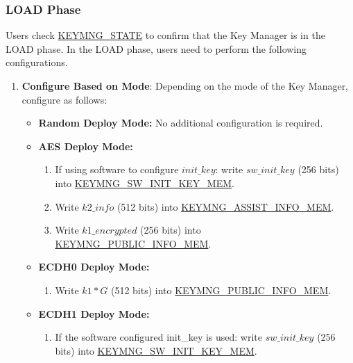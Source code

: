 \documentclass[main\_\_EN.tex]{subfiles}
\begin{document}
\subsubsection{LOAD Phase}
Users check \hyperref[fielddesc:KEYMNGSTATE]{KEYMNG\_STATE} to confirm that the Key Manager is in the LOAD phase. In the LOAD phase, users need to perform the following configurations.
\begin{enumerate}
    \item \textbf{Configure Based on Mode}: Depending on the mode of the Key Manager, configure as follows:
    \begin{itemize}
        \item \textbf{Random Deploy Mode:} No additional configuration is required.
        \item \textbf{AES Deploy Mode:}
        \begin{enumerate}
            \item If using software to configure \begin{math}init\_key\end{math}: write \begin{math}sw\_init\_key\end{math} (256 bits) into \hyperref[mem:keymng-sw-init-key]{KEYMNG\_SW\_INIT\_KEY\_MEM}.
            \item Write \begin{math}k2\_info\end{math} (512 bits) into \hyperref[mem:keymng-assist-info]{KEYMNG\_ASSIST\_INFO\_MEM}.
            \item Write \begin{math}k1\_encrypted\end{math} (256 bits) into \hyperref[mem:keymng-public-info]{KEYMNG\_PUBLIC\_INFO\_MEM}.
        \end{enumerate}
        \item \textbf{ECDH0 Deploy Mode:}
        \begin{enumerate}
            \item Write \begin{math}k1*G\end{math} (512 bits) into \hyperref[mem:keymng-public-info]{KEYMNG\_PUBLIC\_INFO\_MEM}.
        \end{enumerate}
        \item \textbf{ECDH1 Deploy Mode:}
        \begin{enumerate}
            \item If the software configured init\_key is used: write \begin{math}sw\_init\_key\end{math} (256 bits) into \hyperref[mem:keymng-sw-init-key]{KEYMNG\_SW\_INIT\_KEY\_MEM}.

\end{enumerate}
\end{itemize}
\end{enumerate}
\end{document}

